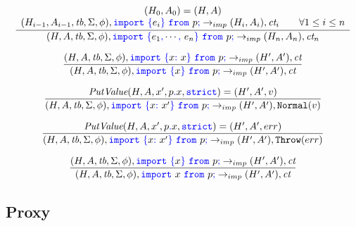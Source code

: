 \documentclass[a4paper]{article}
\newcommand{\code}[1]{\textcolor{blue}{\tt #1}}
\newcommand{\tb}{\emph{tb}}
\newcommand{\ct}{\emph{ct}}
\begin{document}
\begin{equation*}
\frac{
    \begin{array}{c}
    (H_0, A_0) = (H, A) \\
    (H_{i-1}, A_{i-1}, \tb, \Sigma, \phi), \code{import}\ \code{\{}e_i\code{\}}\ \code{from}\ p\code{;} \rightarrow_{imp} (H_i, A_i), \ct_i \qquad \forall 1 \le i \le n
    \end{array}
}{
    (H, A, \tb, \Sigma, \phi), \code{import}\ \code{\{}e_1\code{,} \cdots \code{,}\ e_n\code{\}}\ \code{from}\ p\code{;} \rightarrow_{imp} (H_n, A_n), \ct_n
}
\end{equation*}

\begin{equation*}
\frac{
    (H, A, \tb, \Sigma, \phi), \code{import}\ \code{\{}x\code{:}\ x\code{\}}\ \code{from}\ p\code{;} \rightarrow_{imp} (H', A'), \ct
}{
    (H, A, \tb, \Sigma, \phi), \code{import}\ \code{\{}x\code{\}}\ \code{from}\ p\code{;} \rightarrow_{imp} (H', A'), \ct
}
\end{equation*}

\begin{equation*}
\frac{
    \emph{PutValue} (H, A, x', p\code{.}x, \code{strict}) = (H', A', v)
}{
    (H, A, \tb, \Sigma, \phi), \code{import}\ \code{\{}x\code{:}\ x'\code{\}}\ \code{from}\ p\code{;} \rightarrow_{imp} (H', A'), \texttt{Normal} (v)
}
\end{equation*}

\begin{equation*}
\frac{
    \emph{PutValue} (H, A, x', p\code{.}x, \code{strict}) = (H', A', err)
}{
    (H, A, \tb, \Sigma, \phi), \code{import}\ \code{\{}x\code{:}\ x'\code{\}}\ \code{from}\ p\code{;} \rightarrow_{imp} (H', A'), \texttt{Throw} (err)
}
\end{equation*}

\begin{equation*}
\frac{
    (H, A, \tb, \Sigma, \phi), \code{import}\ \code{\{}x\code{\}}\ \code{from}\ p\code{;} \rightarrow_{imp} (H', A'), \ct
}{
    (H, A, \tb, \Sigma, \phi), \code{import}\ x\ \code{from}\ p\code{;} \rightarrow_{imp} (H', A'), \ct
}
\end{equation*}

\subsection{Proxy}
\end{document}
